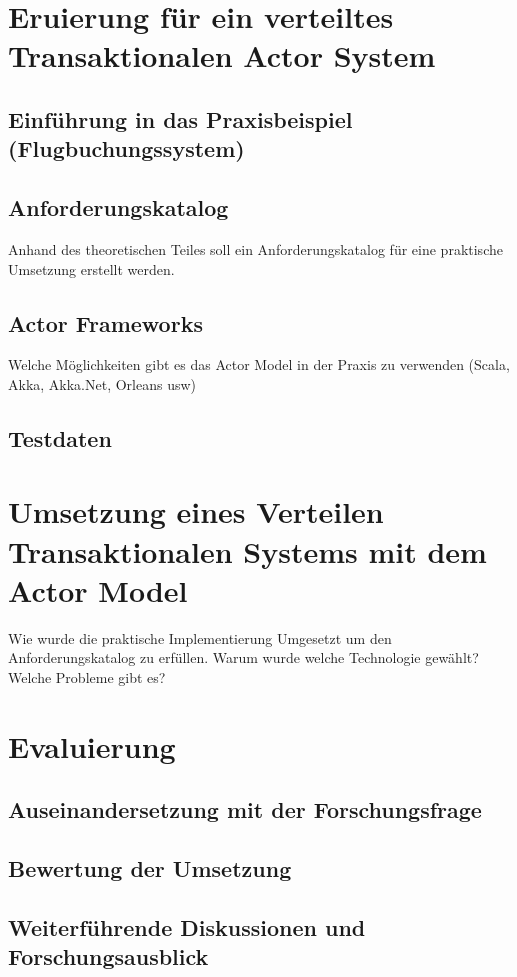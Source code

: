 \chapter{Eruierung für ein verteiltes Transaktionalen Actor System} \label{cha:Eruierung}

\section{Einführung in das Praxisbeispiel (Flugbuchungssystem)}

\section{Anforderungskatalog}
Anhand des theoretischen Teiles soll ein Anforderungskatalog für eine praktische Umsetzung erstellt werden.

\section{Actor Frameworks}\label{sec:ActorFrameworks}
Welche Möglichkeiten gibt es das Actor Model in der Praxis zu verwenden (Scala, Akka, Akka.Net, Orleans usw)

\section{Testdaten}

\chapter{Umsetzung eines Verteilen Transaktionalen Systems mit dem Actor Model}\label{cha:practicalDevelopment}
Wie wurde die praktische Implementierung Umgesetzt um den Anforderungskatalog zu erfüllen. Warum wurde welche Technologie gewählt? Welche Probleme gibt es? 

\chapter{Evaluierung} \label{cha:evaluation}
\section{Auseinandersetzung mit der Forschungsfrage}
\section{Bewertung der Umsetzung}
\section{Weiterführende Diskussionen und Forschungsausblick}
